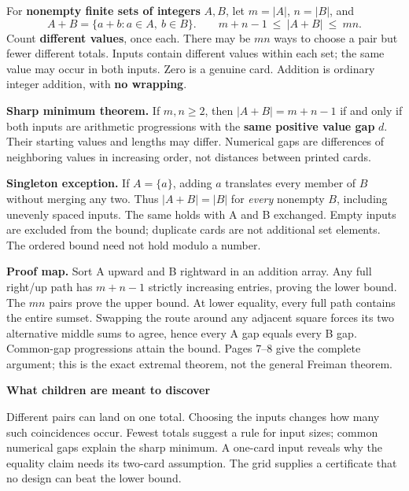 \documentclass[11pt]{article}
\newcommand{\heading}[1]{\vspace{4pt}{\large\bfseries #1}\par}
\newcommand{\sub}[1]{\textbf{#1}\par}
\newcommand{\sset}[1]{\{#1\}}
\begin{document}
\heading{Mathematical overview: sharp bounds and their equality case}
For \textbf{nonempty finite sets of integers} $A,B$, let $m=|A|$, $n=|B|$, and
\[
 A+B=\sset{a+b:a\in A,\ b\in B}.
 \qquad m+n-1\ \leq\ |A+B|\ \leq\ mn.
\]
Count \textbf{different values}, once each. There may be $mn$ ways to choose a pair but fewer different totals. Inputs contain different values within each set; the same value may occur in both inputs. Zero is a genuine card. Addition is ordinary integer addition, with \textbf{no wrapping}.

\textbf{Sharp minimum theorem.} If $m,n\geq2$, then $|A+B|=m+n-1$ if and only if both inputs are arithmetic progressions with the \textbf{same positive value gap} $d$. Their starting values and lengths may differ. Numerical gaps are differences of neighboring values in increasing order, not distances between printed cards.

\textbf{Singleton exception.} If $A=\sset{a}$, adding $a$ translates every member of $B$ without merging any two. Thus $|A+B|=|B|$ for \emph{every} nonempty $B$, including unevenly spaced inputs. The same holds with A and B exchanged. Empty inputs are excluded from the bound; duplicate cards are not additional set elements. The ordered bound need not hold modulo a number.

\textbf{Proof map.} Sort A upward and B rightward in an addition array. Any full right/up path has $m+n-1$ strictly increasing entries, proving the lower bound. The $mn$ pairs prove the upper bound. At lower equality, every full path contains the entire sumset. Swapping the route around any adjacent square forces its two alternative middle sums to agree, hence every A gap equals every B gap. Common-gap progressions attain the bound. Pages 7--8 give the complete argument; this is the exact extremal theorem, not the general Freiman theorem.

\sub{What children are meant to discover}
Different pairs can land on one total. Choosing the inputs changes how many such coincidences occur. Fewest totals suggest a rule for input sizes; common numerical gaps explain the sharp minimum. A one-card input reveals why the equality claim needs its two-card assumption. The grid supplies a certificate that no design can beat the lower bound.
\end{document}

